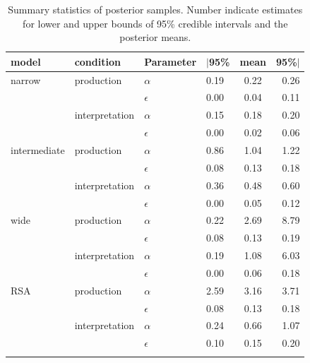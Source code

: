 \documentclass[fleqn]{article}
\begin{document}
\begin{table}[ht]
  \centering


  \begin{tabular}{llllcr}
    \toprule \addlinespace[1ex]
    model        & condition      & Parameter  & $|$95\% & mean & 95\%$|$ \\
    \midrule  \addlinespace[1ex]
    narrow       & production     & $\alpha$   & 0.19    & 0.22 & 0.26 \\
                 &                & $\epsilon$ & 0.00    & 0.04 & 0.11 \\
                 & interpretation & $\alpha$   & 0.15    & 0.18 & 0.20 \\
                 &                & $\epsilon$ & 0.00    & 0.02 & 0.06 \\ \addlinespace[0.75ex]
    intermediate & production     & $\alpha$   & 0.86    & 1.04 & 1.22 \\
                 &                & $\epsilon$ & 0.08    & 0.13 & 0.18 \\
                 & interpretation & $\alpha$   & 0.36    & 0.48 & 0.60 \\
                 &                & $\epsilon$ & 0.00    & 0.05 & 0.12 \\ \addlinespace[0.75ex]
    wide         & production     & $\alpha$   & 0.22    & 2.69 & 8.79 \\
                 &                & $\epsilon$ & 0.08    & 0.13 & 0.19 \\
                 & interpretation & $\alpha$   & 0.19    & 1.08 & 6.03 \\
                 &                & $\epsilon$ & 0.00    & 0.06 & 0.18 \\ \addlinespace[0.75ex]
    RSA          & production     & $\alpha$   & 2.59    & 3.16 & 3.71 \\
                 &                & $\epsilon$ & 0.08    & 0.13 & 0.18 \\
                 & interpretation & $\alpha$   & 0.24    & 0.66 & 1.07 \\
                 &                & $\epsilon$ & 0.10    & 0.15 & 0.20 \\ \addlinespace[0.25ex]
    \bottomrule \\
  \end{tabular}

  \caption{
    Summary statistics of posterior samples.
    Number indicate estimates for lower and upper bounds of 95\% credible intervals and the posterior means.
  }
  \label{fig:posterior-stats}
\end{table}
\end{document}
